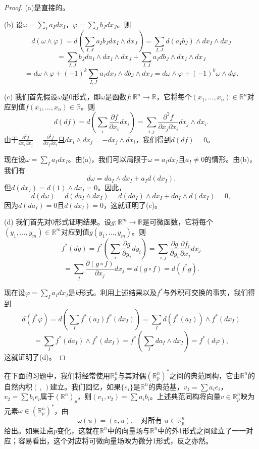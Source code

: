 \documentclass[12pt,a4paper]{ctexbook}
\begin{document}
\begin{proof}
(a)是直接的。

(b) 设$\omega = \sum_I a_I dx_I$，$\varphi = \sum_J b_J dx_J$。则
$$d(\omega\wedge\varphi) = d\left(\sum_{I,J} a_I b_J dx_I\wedge dx_J\right) = \sum_{I,J} d(a_I b_J)\wedge dx_I\wedge dx_J$$
$$= \sum_{I,J} b_J da_I\wedge dx_I\wedge dx_J + \sum_{I,J} a_I db_J\wedge dx_I\wedge dx_J$$
$$= d\omega\wedge\varphi + (-1)^k\sum_{I,J} a_I dx_I\wedge db_J\wedge dx_J = d\omega\wedge\varphi + (-1)^k\omega\wedge d\varphi.$$

(c) 我们首先假设$\omega$是0形式，即$\omega$是函数$f:\mathbb{R}^n\to\mathbb{R}$，它将每个$(x_1,\ldots,x_n)\in\mathbb{R}^n$对应到值$f(x_1,\ldots,x_n)\in\mathbb{R}$。则
$$d(df) = d\left(\sum_i \frac{\partial f}{\partial x_i}dx_i\right) = \sum_{i,j} \frac{\partial^2 f}{\partial x_j\partial x_i}dx_j\wedge dx_i.$$
由于$\frac{\partial^2 f}{\partial x_i\partial x_j} = \frac{\partial^2 f}{\partial x_j\partial x_i}$且$dx_i\wedge dx_j = -dx_j\wedge dx_i$，我们得到$d(df)=0$。

现在设$\omega = \sum_I a_I dx_I$。由(a)，我们可以局限于$\omega = a_I dx_I$且$a_I\neq 0$的情形。由(b)，我们有
$$d\omega = da_I\wedge dx_I + a_I d(dx_I).$$
但$d(dx_I) = d(1)\wedge dx_I = 0$。因此，
$$d(d\omega) = d(da_I\wedge dx_I) = d(da_I)\wedge dx_I + da_I\wedge d(dx_I) = 0,$$
因为$d(da_I)=0$且$d(dx_I)=0$，这就证明了(c)。

(d) 我们首先对0形式证明结果。设$g:\mathbb{R}^m\to\mathbb{R}$是可微函数，它将每个$(y_1,\ldots,y_m)\in\mathbb{R}^m$对应到值$g(y_1,\ldots,y_m)$。则
$$f^*(dg) = f^*\left(\sum_i \frac{\partial g}{\partial y_i}dy_i\right) = \sum_{i,j} \frac{\partial g}{\partial y_i}\frac{\partial f_i}{\partial x_j}dx_j$$
$$= \sum_j \frac{\partial(g\circ f)}{\partial x_j}dx_j = d(g\circ f) = d(f^*g).$$

现在设$\varphi = \sum_I a_I dx_I$是$k$形式。利用上述结果以及$f^*$与外积可交换的事实，我们得到
$$d(f^*\varphi) = d\left(\sum_I f^*(a_I)f^*(dx_I)\right) = \sum_I d(f^*(a_I))\wedge f^*(dx_I)$$
$$= \sum_I f^*(da_I)\wedge f^*(dx_I) = f^*\left(\sum_I da_I\wedge dx_I\right) = f^*(d\varphi),$$
这就证明了(d)。
\end{proof}

在下面的习题中，我们将经常使用$\mathbb{R}_p^n$与其对偶$(\mathbb{R}_p^n)^*$之间的典范同构，它由$\mathbb{R}^n$的自然内积$(\,,\,)$建立。我们回忆，如果$\{e_i\}$是$\mathbb{R}^n$的典范基，$v_1 = \sum a_i e_i$，$v_2 = \sum b_i e_i$属于$(\mathbb{R}^n)_p$，则$(v_1,v_2) = \sum a_i b_i$。上述典范同构将向量$v\in\mathbb{R}_p^n$映为元素$\omega\in(\mathbb{R}_p^n)^*$，由
$$\omega(u) = (v,u),\quad \text{对所有 } u\in\mathbb{R}_p^n$$
给出。如果让点$p$变化，这就在$\mathbb{R}^n$中的向量场与$\mathbb{R}^n$中的外1形式之间建立了一一对应；容易看出，这个对应将可微向量场映为微分1形式，反之亦然。
\end{document}
